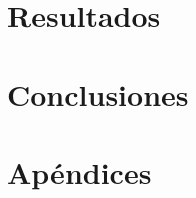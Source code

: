 \documentclass[12pt,titlepage,twoside,openright]{book}
\begin{document}
\chapter{Resultados}
\label{cap:resultados}

\chapter{Conclusiones}
\label{cap:conclusiones}

\backmatter




\appendix
\chapter{Apéndices}
\label{ap:apendices}
\end{document}
